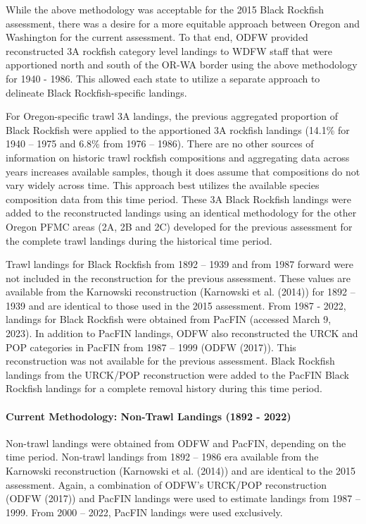 \documentclass[11pt,
  letterpaper,
]{article}
\begin{document}
While the above methodology was acceptable for the 2015 Black Rockfish assessment, there was a desire for a more equitable approach between Oregon and Washington for the current assessment. To that end, ODFW provided reconstructed 3A rockfish category level landings to WDFW staff that were apportioned north and south of the OR-WA border using the above methodology for 1940 - 1986. This allowed each state to utilize a separate approach to delineate Black Rockfish-specific landings.

For Oregon-specific trawl 3A landings, the previous aggregated proportion of Black Rockfish were applied to the apportioned 3A rockfish landings (14.1\% for 1940 -- 1975 and 6.8\% from 1976 -- 1986). There are no other sources of information on historic trawl rockfish compositions and aggregating data across years increases available samples, though it does assume that compositions do not vary widely across time. This approach best utilizes the available species composition data from this time period. These 3A Black Rockfish landings were added to the reconstructed landings using an identical methodology for the other Oregon PFMC areas (2A, 2B and 2C) developed for the previous assessment for the complete trawl landings during the historical time period.

Trawl landings for Black Rockfish from 1892 -- 1939 and from 1987 forward were not included in the reconstruction for the previous assessment. These values are available from the Karnowski reconstruction (Karnowski et al. (2014)) for 1892 -- 1939 and are identical to those used in the 2015 assessment. From 1987 - 2022, landings for Black Rockfish were obtained from PacFIN (accessed March 9, 2023). In addition to PacFIN landings, ODFW also reconstructed the URCK and POP categories in PacFIN from 1987 -- 1999 (ODFW (2017)). This reconstruction was not available for the previous assessment. Black Rockfish landings from the URCK/POP reconstruction were added to the PacFIN Black Rockfish landings for a complete removal history during this time period.

\hypertarget{current-methodology-non-trawl-landings-1892---2022}{%
\paragraph{Current Methodology: Non-Trawl Landings (1892 - 2022)}\label{current-methodology-non-trawl-landings-1892---2022}}

Non-trawl landings were obtained from ODFW and PacFIN, depending on the time period. Non-trawl landings from 1892 -- 1986 era available from the Karnowski reconstruction (Karnowski et al. (2014)) and are identical to the 2015 assessment. Again, a combination of ODFW's URCK/POP reconstruction (ODFW (2017)) and PacFIN landings were used to estimate landings from 1987 -- 1999. From 2000 -- 2022, PacFIN landings were used exclusively.
\end{document}
